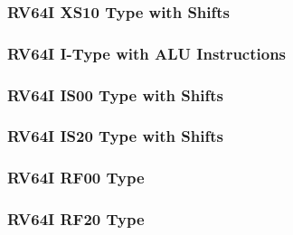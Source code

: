 

\subsubsection[{\small RV64I XS10 Type with Shifts}]{RV64I XS10 Type with Shifts} \label{sec:format-RV64I-XS10}



\subsubsection[{\small RV64I I-Type with ALU Instructions}]{RV64I I-Type with ALU Instructions} \label{sec:format-RV64I-I-ALU}



\subsubsection[{\small RV64I IS00 Type with Shifts}]{RV64I IS00 Type with Shifts} \label{sec:format-RV64I-IS00}



\subsubsection[{\small RV64I IS20 Type with Shifts}]{RV64I IS20 Type with Shifts} \label{sec:format-RV64I-IS20}



\subsubsection[{\small RV64I RF00 Type}]{RV64I RF00 Type} \label{sec:format-RV64I-RF00}



\subsubsection[{\small RV64I RF20 Type}]{RV64I RF20 Type} \label{sec:format-RV64I-RF20}



